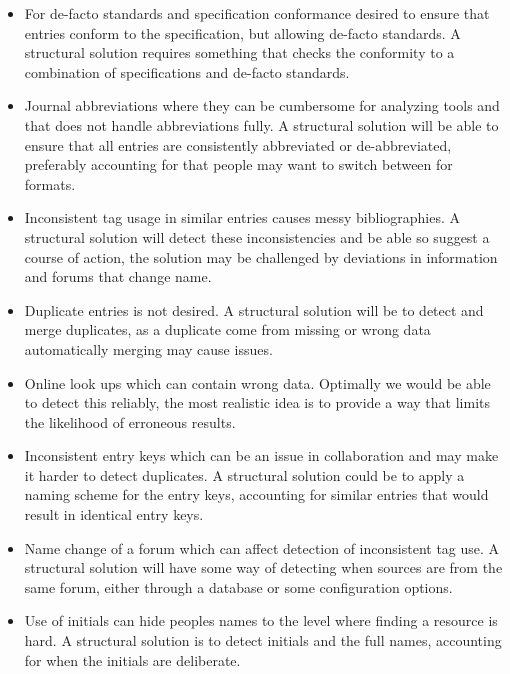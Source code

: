 \begin{itemize}
\item For de-facto standards and specification conformance desired to
  ensure that entries conform to the {\bibtex} specification, but
  allowing de-facto standards.  A structural solution requires
  something that checks the conformity to a combination of
  specifications and de-facto standards.

\item Journal abbreviations where they can be cumbersome for analyzing
  tools and that {\bibtex} does not handle abbreviations fully.  A
  structural solution will be able to ensure that all entries are
  consistently abbreviated or de-abbreviated, preferably accounting
  for that people may want to switch between for formats.

\item Inconsistent tag usage in similar entries causes messy
  bibliographies. A structural solution will detect these
  inconsistencies and be able so suggest a course of action, the
  solution may be challenged by deviations in information and forums
  that change name.

\item Duplicate entries is not desired.  A structural solution will be
  to detect and merge duplicates, as a duplicate come from missing or
  wrong data automatically merging may cause issues.

\item Online look ups which can contain wrong data.  Optimally we
  would be able to detect this reliably, the most realistic idea is to
  provide a way that limits the likelihood of erroneous results.

\item Inconsistent entry keys which can be an issue in collaboration
  and may make it harder to detect duplicates.  A structural solution
  could be to apply a naming scheme for the entry keys, accounting for
  similar entries that would result in identical entry keys.

\item Name change of a forum which can affect detection of
  inconsistent tag use.  A structural solution will have some way of
  detecting when sources are from the same forum, either through a
  database or some configuration options.

\item Use of initials can hide peoples names to the level where
  finding a resource is hard.  A structural solution is to detect
  initials and the full names, accounting for when the initials are
  deliberate.


\end{itemize}
